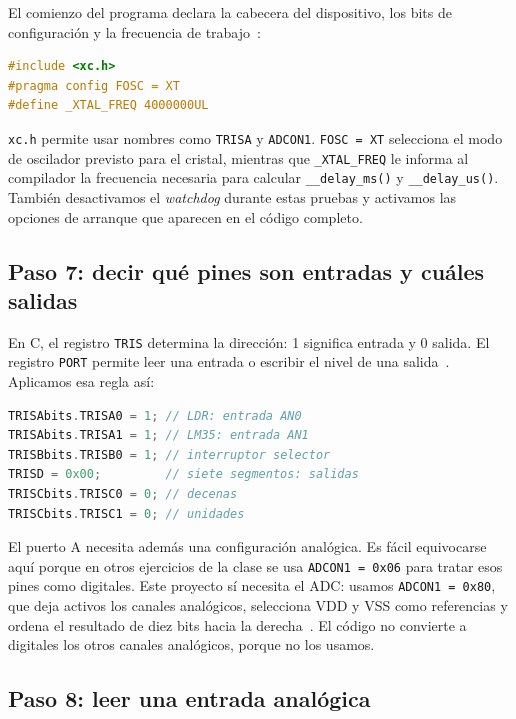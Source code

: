 \documentclass[11pt,a4paper]{article}
\begin{document}
El comienzo del programa declara la cabecera del dispositivo, los bits de configuración y la frecuencia de trabajo~\cite{clasepic,claseconfig}:

\begin{lstlisting}[language=C]
#include <xc.h>
#pragma config FOSC = XT
#define _XTAL_FREQ 4000000UL
\end{lstlisting}

\texttt{xc.h} permite usar nombres como \texttt{TRISA} y \texttt{ADCON1}. \texttt{FOSC = XT} selecciona el modo de oscilador previsto para el cristal, mientras que \texttt{\_XTAL\_FREQ} le informa al compilador la frecuencia necesaria para calcular \texttt{\_\_delay\_ms()} y \texttt{\_\_delay\_us()}. También desactivamos el \emph{watchdog} durante estas pruebas y activamos las opciones de arranque que aparecen en el código completo.

\subsection{Paso 7: decir qué pines son entradas y cuáles salidas}

En C, el registro \texttt{TRIS} determina la dirección: 1 significa entrada y 0 salida. El registro \texttt{PORT} permite leer una entrada o escribir el nivel de una salida~\cite{clasepic}. Aplicamos esa regla así:

\begin{lstlisting}[language=C]
TRISAbits.TRISA0 = 1; // LDR: entrada AN0
TRISAbits.TRISA1 = 1; // LM35: entrada AN1
TRISBbits.TRISB0 = 1; // interruptor selector
TRISD = 0x00;         // siete segmentos: salidas
TRISCbits.TRISC0 = 0; // decenas
TRISCbits.TRISC1 = 0; // unidades
\end{lstlisting}

El puerto A necesita además una configuración analógica. Es fácil equivocarse aquí porque en otros ejercicios de la clase se usa \texttt{ADCON1 = 0x06} para tratar esos pines como digitales. Este proyecto sí necesita el ADC: usamos \texttt{ADCON1 = 0x80}, que deja activos los canales analógicos, selecciona VDD y VSS como referencias y ordena el resultado de diez bits hacia la derecha~\cite{claseanalog}. El código no convierte a digitales los otros canales analógicos, porque no los usamos.

\subsection{Paso 8: leer una entrada analógica}
\end{document}
